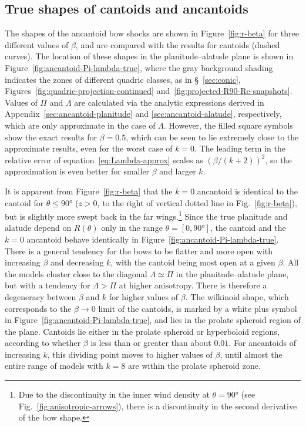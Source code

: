 \documentclass[useAMS, usenatbib, a4paper]{mnras}
\begin{document}
\subsection{True shapes of cantoids and ancantoids}
\label{sec:true-cantoids-ancantoids}

The shapes of the ancantoid bow shocks are shown in
Figure~\ref{fig:r-beta} for three different values of \(\beta\), and are
compared with the \CRW{} results for cantoids (dashed curves).  The
location of these shapes in the planitude--alatude plane is shown in
Figure~\ref{fig:ancantoid-Pi-lambda-true}, where the gray background
shading indicates the zones of different quadric classes, as in
\S~\ref{sec:conic}, Figures~\ref{fig:quadric-projection-continued}
and~\ref{fig:projected-R90-Rc-snapshots}.  Values of \(\Pi\) and
\(\Lambda\) are calculated via the analytic expressions derived in
Appendix~\ref{sec:ancantoid-planitude} and
\ref{sec:ancantoid-alatude}, respectively, which are only approximate
in the case of \(\Lambda\).  However, the filled square symbols show the
exact results for \(\beta = 0.5\), which can be seen to lie extremely close
to the approximate results, even for the worst case of \(k = 0\). The
leading term in the relative error of
equation~\eqref{eq:Lambda-approx} scales as \((\beta / (k + 2))^2\), so
the approximation is even better for smaller \(\beta\) and larger \(k\).

It is apparent from Figure~\ref{fig:r-beta} that the \(k=0\) ancantoid
is identical to the cantoid for \(\theta \le \ang{90}\) (\(z > 0\), to the right
of vertical dotted line in Fig.~\ref{fig:r-beta}), but is slightly
more swept back in the far wings.\footnote{%
  \label{fn:discontinuity}
  Due to the discontinuity in the inner wind density at
  \(\theta = \ang{90}\) (see Fig.~\ref{fig:anisotropic-arrows}), there is a
  discontinuity in the second derivative of the bow shape.} %
Since the true planitude and alatude depend on \(R(\theta)\) only in the
range \(\theta = [0, \ang{90}]\), the cantoid and the \(k = 0\) ancantoid
behave identically in Figure~\ref{fig:ancantoid-Pi-lambda-true}.
There is a general tendency for the bows to be flatter and more open
with increasing \(\beta\) and decreasing \(k\), with the cantoid being
most open at a given \(\beta\).  All the models cluster close to the
diagonal \(\Lambda \simeq \Pi\) in the planitude--alatude plane, but with a tendency
for \(\Lambda > \Pi\) at higher anisotropy.  There is therefore a degeneracy
between \(\beta\) and \(k\) for higher values of \(\beta\).  The wilkinoid
shape, which corresponds to the \(\beta \to 0\) limit of the cantoids, is
marked by a white plus symbol in
Figure~\ref{fig:ancantoid-Pi-lambda-true}, and lies in the prolate
spheroid region of the plane.  Cantoids lie either in the prolate
spheroid or hyperboloid regions, according to whether \(\beta\) is less
than or greater than about \(0.01\).  For ancantoids of increasing
\(k\), this dividing point moves to higher values of \(\beta\), until
almost the entire range of models with \(k = 8\) are within the
prolate spheroid zone.
\end{document}
